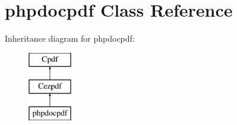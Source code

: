 \hypertarget{classphpdocpdf}{\section{phpdocpdf \-Class \-Reference}
\label{classphpdocpdf}
}
\-Inheritance diagram for phpdocpdf\-:\begin{figure}[H]
\begin{center}
\leavevmode
\includegraphics[height=3.000000cm]{classphpdocpdf}
\end{center}
\end{figure}
